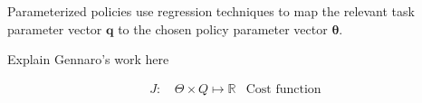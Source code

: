 \documentclass[12pt]{article}
\newcommand{\polg}   {\ensuremath{\pi^g}}
\newcommand{\pol}    {\ensuremath{\pi}}
\newcommand{\act}    {\ensuremath{\mathbf{a}}}
\newcommand{\sta}    {\ensuremath{\mathbf{s}}}
\newcommand{\appsp}  {\ensuremath{\Theta}}
\newcommand{\feat}   {\ensuremath{f}}
\newcommand{\featsp} {\ensuremath{\emph{F}}}
\newcommand{\costsp} {\ensuremath{R}}
\newcommand{\taskp}  {\ensuremath{\mathbf{q}}}
\newcommand{\taskpv} {\ensuremath{q}}
\newcommand{\costf}  {\ensuremath{J}}
\newcommand{\obsm}   {\ensuremath{O}}
\newcommand{\app}    {\ensuremath{\bm{\theta}}}
\newcommand{\taskpsp}{\ensuremath{Q}}
\newcommand{\featv}  {\ensuremath{\mathbf{f}}}
\newcommand{\covar}  {\ensuremath{\bm{\Sigma}}}
\begin{document}
Parameterized policies use regression techniques to map the relevant task parameter vector $\taskp$ to the chosen policy parameter vector $\app$.

\color{red} Explain Gennaro's work here \color{black}

\begin{align}
\costf\mbox{: } &\label{eq:cost} \appsp \times \taskpsp \mapsto \mathbb{R}&\mbox{Cost function}
\end{align}



\end{document}
